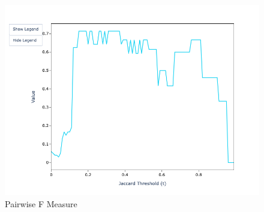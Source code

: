 \documentclass[11pt]{article}
\begin{document}
\begin{figure}[h!]
\begin{minipage}{0.32\textwidth}
            \includegraphics[width=\textwidth]{sample-usage/mini-alg-pf}
            \caption{Pairwise F Measure}
        \end{minipage}
    \end{figure}
\end{document}
